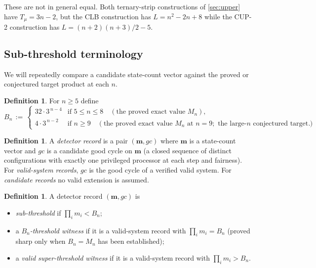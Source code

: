 \documentclass[11pt,a4paper]{article}
\theoremstyle{plain}
\theoremstyle{definition}
\newtheorem{definition}[theorem]{Definition}
\newcommand{\Mn}{M_n}
\newcommand{\Bn}{B_n}
\begin{document}
These are not in general equal.  Both ternary-strip constructions of
\cref{sec:upper} have $T_\mu = 3n - 2$, but the CLB construction has
$L = n^2 - 2n + 8$ while the CUP-2 construction has
$L = (n+2)(n+3)/2 - 5$.

\subsection{Sub-threshold terminology}\label{sec:prelim-subthreshold}

We will repeatedly compare a candidate state-count vector against the
proved or conjectured target product at each $n$.

\begin{definition}\label{def:Bn}
For $n \ge 5$ define
\[
   \Bn \,:=\, \begin{cases}
       32 \cdot 3^{\,n-4} & \text{if } 5 \le n \le 8 \quad (\text{the proved exact value } \Mn),\\[2pt]
       4 \cdot 3^{\,n-2}  & \text{if } n \ge 9      \quad (\text{the proved exact value } \Mn \text{ at } n = 9; \text{ the large-}n\text{ conjectured target}).
   \end{cases}
\]
\end{definition}

\begin{definition}\label{def:record}
A \emph{detector record} is a pair $(\mathbf{m}, gc)$ where
$\mathbf{m}$ is a state-count vector and $gc$ is a candidate good cycle
on $\mathbf{m}$ (a closed sequence of distinct configurations with
exactly one privileged processor at each step and fairness).  For
\emph{valid-system records}, $gc$ is the good cycle of a verified
valid system.  For \emph{candidate records} no valid extension is
assumed.
\end{definition}

\begin{definition}\label{def:thresholds}
A detector record $(\mathbf{m}, gc)$ is
\begin{itemize}[leftmargin=*]
\item \emph{sub-threshold} if $\prod_i m_i < \Bn$;
\item a \emph{$\Bn$-threshold witness} if it is a valid-system record with $\prod_i m_i = \Bn$ (proved sharp only when $\Bn = \Mn$ has been established);
\item a \emph{valid super-threshold witness} if it is a valid-system record with $\prod_i m_i > \Bn$.
\end{itemize}
\end{definition}
\end{document}
